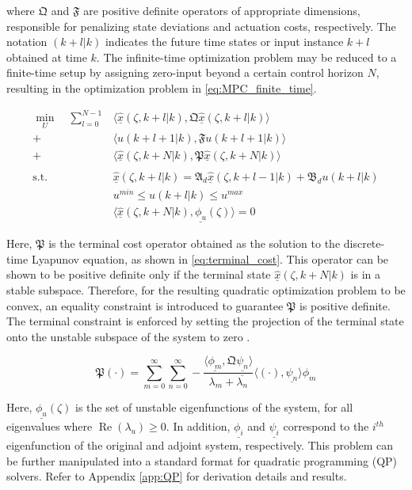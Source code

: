 where $\mathfrak{Q}$ and $\mathfrak{F}$ are positive definite operators of appropriate dimensions, responsible for penalizing state deviations and actuation costs, respectively. The notation $(k+l|k)$ indicates the future time states or input instance $k+l$ obtained at time $k$. The infinite-time optimization problem may be reduced to a finite-time setup by assigning zero-input beyond a certain control horizon $N$, resulting in the optimization problem in \eqref{eq:MPC_finite_time}.

\begin{equation} \label{eq:MPC_finite_time}
    \begin{aligned}
        \min_{U} \quad \sum_{l=0}^{N-1} &\langle \underline{\hat{x}}(\zeta, k+l | k), \mathfrak{Q} \underline{\hat{x}}(\zeta, k+l | k) \rangle \\
        + &\langle u(k+l+1 | k), \mathfrak{F} u(k+l+1|k) \rangle \\
        + &\langle \underline{\hat{x}}(\zeta, k+N | k), \mathfrak{P} \underline{\hat{x}}(\zeta, k+N | k) \rangle \\
        \, \\
        \text{s.t.} \quad &\underline{\hat{x}}(\zeta, k+l | k) = \mathfrak{A}_d \underline{\hat{x}}(\zeta, k+l-1 | k) + \mathfrak{B}_d u(k+l | k) \\
        &u^{min} \leq u(k+l | k) \leq u^{max} \\
        & \langle \underline{\hat{x}}(\zeta, k+N | k), \underline{\phi_u}(\zeta) \rangle = 0
    \end{aligned}
\end{equation}

Here, $\mathfrak{P}$ is the terminal cost operator obtained as the solution to the discrete-time Lyapunov equation, as shown in \eqref{eq:terminal_cost}. This operator can be shown to be positive definite only if the terminal state $\underline{\hat{x}}(\zeta, k+N | k)$ is in a stable subspace. Therefore, for the resulting quadratic optimization problem to be convex, an equality constraint is introduced to guarantee $\mathfrak{P}$ is positive definite. The terminal constraint is enforced by setting the projection of the terminal state onto the unstable subspace of the system to zero \cite{curtainbook, xu2017linear, khatibi2021model}.

\begin{equation} \label{eq:terminal_cost}
    \mathfrak{P} (\cdot) = \sum_{m=0}^{\infty} \sum_{n=0}^{\infty} 
    -\frac{
        \langle \underline{\phi_m} , \mathfrak{Q} \underline{\psi_n} \rangle
    }{
        \lambda_m + \overline{\lambda_n}
    }
    \langle (\cdot) , \underline{\psi_n} \rangle \phi_m
\end{equation}

Here, $\underline{\phi_u}(\zeta)$ is the set of unstable eigenfunctions of the system, for all eigenvalues where $\operatorname{Re}(\lambda_u) \geq 0$. In addition, $\underline{\phi_i}$ and $\underline{\psi_i}$ correspond to the $i^{th}$ eigenfunction of the original and adjoint system, respectively. This problem can be further manipulated into a standard format for quadratic programming (QP) solvers. Refer to Appendix \ref{app:QP} for derivation details and results.